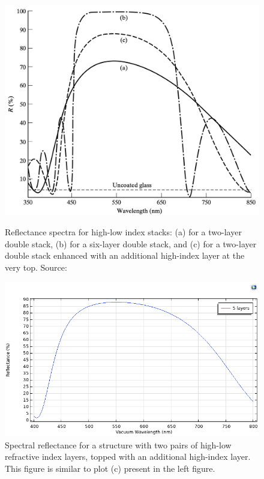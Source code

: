 \begin{figure}[H]
  \centering
  \begin{minipage}{0.48\textwidth}
    \centering
    \includegraphics[width=\textwidth]{Chapters/Figures/Chapter 4 Figures/High-Reflectance Graphs in the Optics Book.png}
    \caption{Reflectance spectra for high-low index stacks: (a) for a two-layer double stack, (b) for a six-layer double stack, and (c) for a two-layer double stack enhanced with an additional high-index layer at the very top. Source: \cite{pedrotti_introduction_2007}}
    \label{fig:Reflectance spectra from optical literature}
  \end{minipage}\hfill
  \begin{minipage}{0.48\textwidth}
    \centering
    \includegraphics[width=\textwidth]{Chapters/Figures/Chapter 4 Figures/High-Reflectance (5 Layers).png}
    \caption{Spectral reflectance for a structure with two pairs of high-low refractive index layers, topped with an additional high-index layer. This figure is similar to plot (c) present in the left figure.}
    \label{fig:Reflectance 5-layer structure}
  \end{minipage}
\end{figure}

